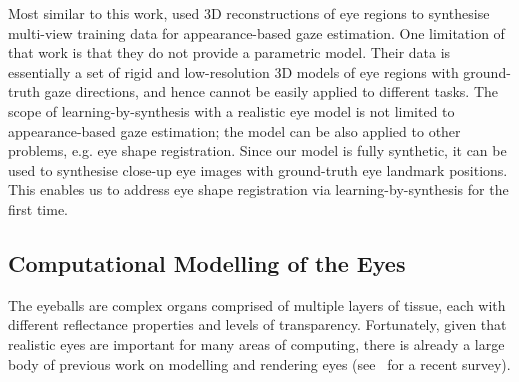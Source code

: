 Most similar to this work, \citet{sugano2014learning} used 3D reconstructions of eye regions to synthesise multi-view training data for appearance-based gaze estimation.
One limitation of that work is that they do not provide a parametric model.
Their data is essentially a set of rigid and low-resolution 3D models of eye regions with ground-truth gaze directions, and hence cannot be easily applied to different tasks.
The scope of learning-by-synthesis with a realistic eye model is not limited to appearance-based gaze estimation; the model can be also applied to other problems, e.g. eye shape registration.
Since our model is fully synthetic, it can be used to synthesise close-up eye images with ground-truth eye landmark positions.
This enables us to address eye shape registration via learning-by-synthesis for the first time.



\subsection{Computational Modelling of the Eyes}



The eyeballs are complex organs comprised of multiple layers of tissue, each with different reflectance properties and levels of transparency.
Fortunately, given that realistic eyes are important for many areas of computing, there is already a large body of previous work on modelling and rendering eyes (see~\cite{ruhland2014look} for a recent survey).


